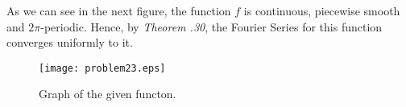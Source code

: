 \begin{questions}

\begin{solution}
As we can see in the next figure, the function $f$ is continuous, piecewise smooth and $2\pi$-periodic. Hence, by \textsl{Theorem .30}, the Fourier Series for this function converges uniformly to it.

\begin{figure}[H]
\centering     %
{\texttt{[image: problem23.eps]}}
\caption{Graph of the given functon.}
\end{figure}

\end{solution}
\end{questions}
